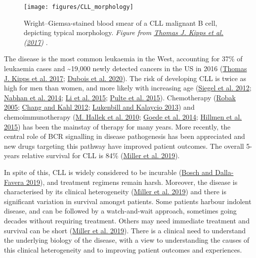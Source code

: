 \documentclass[11pt, a4paper, twosided]{book}
\begin{document}
\begin{figure}

{\centering \texttt{[image: figures/CLL\_morphology]} 

}

\caption{Wright--Giemsa-stained blood smear of a CLL malignant B cell, depicting typical morphology. \emph{Figure from \protect\hyperlink{ref-Kipps2017}{Thomas J. Kipps et al.} (\protect\hyperlink{ref-Kipps2017}{2017}) }.}\label{fig:CLLmorphology}
\end{figure}
The disease is the most common leukaemia in the West, accounting for 37\% of leukaemia cases and \textasciitilde19,000 newly detected cancers in the US in 2016 (\protect\hyperlink{ref-Kipps2017}{Thomas J. Kipps et al. 2017}; \protect\hyperlink{ref-Dubois2020}{Dubois et al. 2020}). The risk of developing CLL is twice as high for men than women, and more likely with increasing age (\protect\hyperlink{ref-Siegel2012}{Siegel et al. 2012}; \protect\hyperlink{ref-Nabhan2014}{Nabhan et al. 2014}; \protect\hyperlink{ref-Li2015}{Li et al. 2015}; \protect\hyperlink{ref-Pulte2015}{Pulte et al. 2015}). Chemotherapy (\protect\hyperlink{ref-Robak2005}{Robak 2005}; \protect\hyperlink{ref-Chang2012}{Chang and Kahl 2012}; \protect\hyperlink{ref-Lukenbill2013}{Lukenbill and Kalaycio 2013}) and chemoimmunotherapy (\protect\hyperlink{ref-Hallek2010}{M. Hallek et al. 2010}; \protect\hyperlink{ref-Goede2014}{Goede et al. 2014}; \protect\hyperlink{ref-Hillmen2015}{Hillmen et al. 2015}) has been the mainstay of therapy for many years. More recently, the central role of BCR signalling in disease pathogenesis has been appreciated and new drugs targeting this pathway have improved patient outcomes. The overall 5-years relative survival for CLL is 84\% (\protect\hyperlink{ref-Miller2019}{Miller et al. 2019}).

In spite of this, CLL is widely considered to be incurable (\protect\hyperlink{ref-Bosch2019}{Bosch and Dalla-Favera 2019}), and treatment regimens remain harsh. Moreover, the disease is characterised by its clinical heterogeneity (\protect\hyperlink{ref-Miller2019}{Miller et al. 2019}) and there is significant variation in survival amongst patients. Some patients harbour indolent disease, and can be followed by a watch-and-wait approach, sometimes going decades without requiring treatment. Others may need immediate treatment and survival can be short (\protect\hyperlink{ref-Miller2019}{Miller et al. 2019}). There is a clinical need to understand the underlying biology of the disease, with a view to understanding the causes of this clinical heterogeneity and to improving patient outcomes and experiences.
\end{document}
